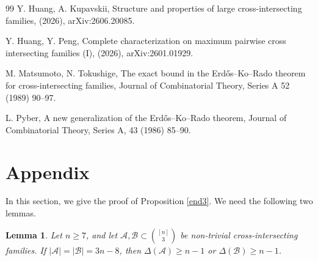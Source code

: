 \documentclass[a4paper,11pt]{article}
\newtheorem{lemma}[theorem]{Lemma}
\newcommand{\m}{\mathcal}
\begin{document}
\begin{thebibliography}{99}
Y. Huang, A. Kupavskii,
Structure and properties of large cross-intersecting families, (2026), arXiv:2606.20085.

 
Y. Huang, Y. Peng,
Complete characterization on maximum pairwise cross
intersecting families (I), 
(2026), arXiv:2601.01929.



M. Matsumoto, N. Tokushige, 
The exact bound in the Erd\H{o}s--Ko--Rado theorem for cross-intersecting families, 
Journal of Combinatorial Theory, Series A  52 (1989) 90--97.

L. Pyber, 
A new generalization of the Erd\H{o}s--Ko--Rado theorem, 
Journal of Combinatorial Theory, Series A, 43 (1986) 85--90.

\end{thebibliography}

\section*{Appendix}
In this section, we give the proof of Proposition \ref{end3}. We need the following two lemmas.


\begin{lemma}\label{end1}
Let $n\ge 7$, and let
$\m A,\m B\subset\binom{[n]}{3}$ be non-trivial
cross-intersecting families. If $|\m A|=|\m B|=3n-8$, then $\Delta(\m A)\ge n-1$ or $\Delta(\m B)\ge n-1$.
\end{lemma}
\end{document}
